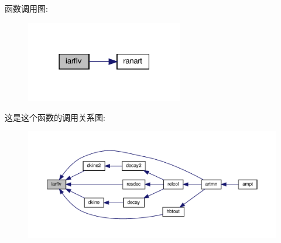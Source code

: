 函数调用图\+:
\nopagebreak
\begin{figure}[H]
\begin{center}
\leavevmode
\includegraphics[width=195pt]{iarflv_8f90_a0654604bfba61e389866be8741d783f7_cgraph}
\end{center}
\end{figure}
这是这个函数的调用关系图\+:
\nopagebreak
\begin{figure}[H]
\begin{center}
\leavevmode
\includegraphics[width=350pt]{iarflv_8f90_a0654604bfba61e389866be8741d783f7_icgraph}
\end{center}
\end{figure}
